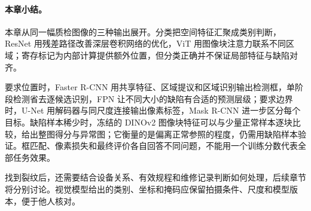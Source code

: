 \paragraph{本章小结。}
本章从同一幅质检图像的三种输出展开。分类把空间特征汇聚成类别判断，ResNet 用残差路径改善深层卷积网络的优化，ViT 用图像块注意力联系不同区域；寄存标记为内部计算提供额外位置，但分类正确并不保证局部特征与缺陷对齐。

要求位置时，Faster R-CNN 用共享特征、区域提议和区域识别输出检测框，单阶段检测省去逐候选识别，FPN 让不同大小的缺陷有合适的预测层级；要求边界时，U-Net 用解码器与同尺度连接输出像素标签，Mask R-CNN 进一步区分每个目标。缺陷样本稀少时，冻结的 DINOv2 图像块特征可以与少量正常样本逐块比较，给出整图得分与异常图；它衡量的是偏离正常参照的程度，仍需用缺陷样本验证。框匹配、像素损失和最终评价各自回答不同问题，不能用一个训练分数代表全部任务效果。

找到裂纹后，还需要结合设备关系、有效规程和维修记录判断如何处理，后续章节将分别讨论。视觉模型给出的类别、坐标和掩码应保留拍摄条件、尺度和模型版本，便于他人核对。
